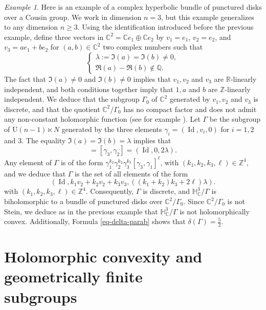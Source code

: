 \documentclass{article}
\theoremstyle{definition}
\theoremstyle{remark}
\newtheorem*{example}{Example}
\newcommand{\C}{\mathbb{C}}
\newcommand{\R}{\mathbb{R}}
\newcommand{\Z}{\mathbb{Z}}
\DeclareMathOperator{\Id}{\text{Id}}
\begin{document}
	\begin{example}Here is an example of a complex hyperbolic bundle of punctured disks over a Cousin group. We work in dimension $n=3$, but this example generalizes to any dimension $n\ge3$. Using the identification introduced before the previous example, define three vectors in $\C^{2}=\C e_1\oplus \C e_2$ by $v_1=e_1$, $v_2=e_2$, and $v_3=ae_1+be_2$ for $(a,b)\in \C^{2}$ two complex numbers such that\begin{equation*}
			\left\{\begin{array}{l}
				\lambda:=\Im(a)=\Im(b)\ne 0, \\
				\Re(a)-\Re(b) \notin \mathbb{Q}.
			\end{array}\right.
		\end{equation*}
		The fact that $\Im(a)\ne0$ and $\Im(b)\ne0$ implies that $v_1,v_2$ and $v_3$ are $\R$-linearly independent, and both conditions together imply that $1,a$ and $b$ are $\Z$-linearly independent. We deduce that the subgroup $\Gamma_0$ of $\C^{2}$ generated by $v_1,v_2$ and $v_3$ is discrete, and that the quotient $\C^{2}/\Gamma_0$ has no compact factor and does not admit any non-constant holomorphic function (see for example \cite[pages 451-452]{napierConvexityPropertiesCoverings1990}).
		Let $\Gamma$ be the subgroup of $\mathrm{U}(n-1)\ltimes N$ generated by the three elements $\gamma_i=(\Id,v_i,0)$ for $i=1,2$ and $3$.
		The equality $\Im(a)=\Im(b)=\lambda$ implies that
		\begin{equation*}
			[\gamma_3,\gamma_1]=[\gamma_3,\gamma_2] = (\Id,0,2\lambda).
		\end{equation*}
		Any element of $\Gamma$ is of the form $\gamma_1^{k_2}\gamma_2^{k_2}\gamma_3^{k_3}[\gamma_3,\gamma_1]^{\ell}$,
		with $(k_1,k_2,k_3,\ell)\in \Z^{4}$, and we deduce that $\Gamma$ is the set of all elements of the form\begin{equation*}
			(\Id,k_1v_2+k_2v_2+k_3v_3,((k_1+k_2)k_3+2\ell)\lambda).
		\end{equation*}
		with $(k_1,k_2,k_3,\ell)\in \Z^{4}$. Consequently, $\Gamma$ is discrete, and $\mathbb{H}^{3}_{\C}/\Gamma$ is biholomorphic to a bundle of punctured disks over $\C^{2}/\Gamma_0$. Since $\C^{2}/\Gamma_0$ is not Stein, we deduce as in the previous example that $\mathbb{H}^{3}_{\C}/\Gamma$ is not holomorphically convex. Additionally, Formula \eqref{eq-delta-parab} shows that $\delta(\Gamma)=\frac{5}{2}$.
	\end{example}
	
	\section{Holomorphic convexity and geometrically finite \\subgroups}\label{section-hol-cvx-geom-fini}
	
\end{document}

